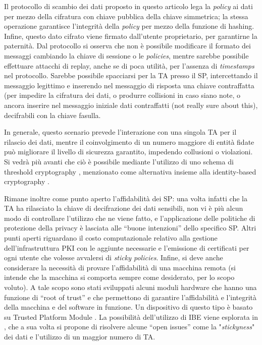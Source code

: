 Il protocollo di scambio dei dati proposto in questo articolo lega la \textit{policy} ai dati per mezzo della cifratura con chiave pubblica della chiave simmetrica; la stessa operazione garantisce l’integrit\`a della \textit{policy} per mezzo della funzione di hashing. Infine, questo dato cifrato viene firmato dall’utente proprietario, per garantirne la paternit\`a. Dal protocollo si osserva che non \`e possibile modificare il formato dei messaggi cambiando la chiave di sessione o le \textit{policies}, mentre sarebbe possibile effettuare attacchi di replay, anche se di poca utilit\`a, per l’assenza di \textit{timestamps} nel protocollo. Sarebbe possibile spacciarsi per la TA presso il SP, intercettando il messaggio legittimo e inserendo nel messaggio di risposta una chiave contraffatta (per impedire la cifratura dei dati, o produrre collisioni in caso siano note, o ancora inserire nel messaggio iniziale dati contraffatti (not really sure about this), decifrabili con la chiave fasulla.

In generale, questo scenario prevede l’interazione con una singola TA per il rilascio dei dati, mentre il coinvolgimento di un numero maggiore di entit\`a fidate può migliorare il livello di sicurezza garantito, impedendo collusioni o violazioni. Si vedr\`a pi\`u avanti che ci\`o \`e possibile mediante l’utilizzo di uno schema di threshold cryptography \cite{shamir1979share}, menzionato come alternativa insieme alla identity-based cryptography \cite{shamir1984identity}.

Rimane inoltre come punto aperto l’affidabilit\`a dei SP: una volta infatti che la TA ha rilasciato la chiave di decifrazione dei dati sensibili, non vi è pi\`u alcun modo di controllare l’utilizzo che ne viene fatto, e l’applicazione delle politiche di protezione della privacy \`e lasciata alle “buone intenzioni” dello specifico SP. Altri punti aperti riguardano il costo computazionale relativo alla gestione dell’infrastruttura PKI con le aggiunte necessarie e l’emissione di certificati per ogni utente che volesse avvalersi di \textit{sticky policies}. Infine, si deve anche considerare la necessit\`a di provare l’affidabilit\`a di una macchina remota (si intende che la macchina si comporta sempre come desiderato, per lo scopo voluto). A tale scopo sono stati sviluppati alcuni moduli hardware che hanno una funzione di “root of trust” e che permettono di garantire l’affidabilit\`a e l’integrit\`a della macchina e del software in funzione. Un dispositivo di questo tipo \`e basato su Trusted Platform Module \cite{standard2009trusted}.
La possibilit\`a dell’utilizzo di IBE viene esplorata in \cite{mont2003towards}, che a sua volta si propone di risolvere alcune “open issues” come la "\textit{stickyness}" dei dati e l’utilizzo di un maggior numero di TA.

